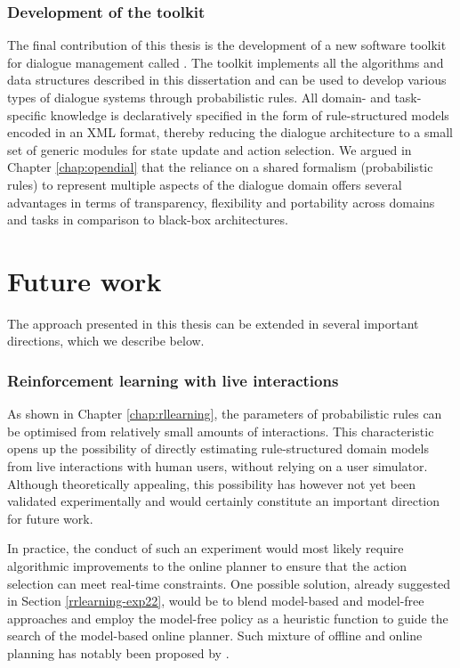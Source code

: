 

\subsubsection*{Development of the \opendial{} toolkit}

The final contribution of this thesis is the development of a new software toolkit for dialogue management called \opendial{}. The toolkit implements all the algorithms and data structures described in this dissertation and can be used to develop various types of dialogue systems through probabilistic rules. All domain- and task-specific knowledge is declaratively specified in the form of rule-structured models encoded in an XML format, thereby reducing the dialogue architecture to a small set of generic modules for state update and action selection.  We argued in Chapter \ref{chap:opendial} that the reliance on a shared   formalism (probabilistic rules) to represent multiple aspects of the dialogue domain offers several advantages in terms of transparency, flexibility and portability across domains and tasks in comparison to black-box architectures.

\section{Future work}

The approach presented in this thesis can be extended in several important directions, which we describe below. 

\subsubsection*{Reinforcement learning with live interactions}

As shown in Chapter \ref{chap:rllearning}, the parameters of probabilistic rules can be optimised from relatively small amounts of interactions.  This characteristic opens up the possibility of directly estimating rule-structured domain models from live interactions with human users, without relying on a user simulator.  Although theoretically appealing, this possibility has however not yet been validated experimentally and would certainly constitute an important direction for future work.

In practice, the conduct of such an experiment would most likely require algorithmic improvements to the online planner to ensure that the action selection can meet real-time constraints. One possible solution, already suggested in Section \ref{rrlearning-exp22}, would be to blend model-based and model-free approaches and employ the model-free policy as a heuristic function to guide the search of the model-based online planner.  Such mixture of offline and online planning has notably been proposed by \cite{RossC07}. 


